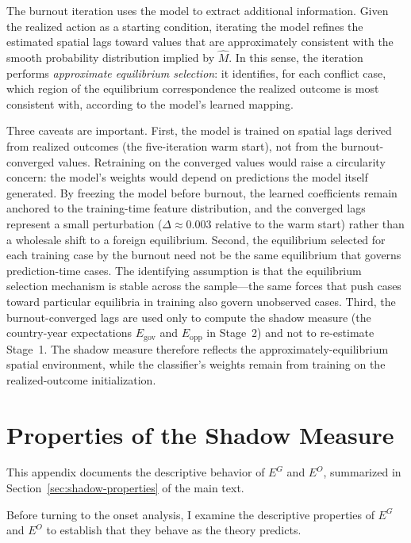 The burnout iteration uses the model to extract additional information.  Given
the realized action as a starting condition, iterating the model refines the
estimated spatial lags toward values that are approximately consistent with the
smooth probability distribution implied by $\hat{M}$.  In this sense, the
iteration performs \textit{approximate equilibrium selection}: it identifies, for each
conflict case, which region of the equilibrium correspondence the realized
outcome is most consistent with, according to the model's learned mapping.

Three caveats are important.  First, the model is trained on spatial lags
derived from realized outcomes (the five-iteration warm start), not from the
burnout-converged values.  Retraining on the converged values would raise a
circularity concern: the model's weights would depend on predictions the model
itself generated.  By freezing the model before burnout, the learned coefficients
remain anchored to the training-time feature distribution, and the converged
lags represent a small perturbation ($\Delta \approx 0.003$ relative to the warm
start) rather than a wholesale shift to a foreign equilibrium.  Second, the
equilibrium selected for each training case by the burnout need not be the same
equilibrium that governs prediction-time cases.  The identifying assumption is
that the equilibrium selection mechanism is stable across the sample---the same
forces that push cases toward particular equilibria in training also govern
unobserved cases.  Third, the burnout-converged lags are used only to compute
the shadow measure (the country-year expectations $E_\text{gov}$ and $E_\text{opp}$ in
Stage~2) and not to re-estimate Stage~1.  The shadow measure therefore reflects
the approximately-equilibrium spatial environment, while the classifier's
weights remain from training on the realized-outcome initialization.

\section{Properties of the Shadow Measure}
\label{app:properties}

This appendix documents the descriptive behavior of $E^G$ and $E^O$,
summarized in Section~\ref{sec:shadow-properties} of the main text.

Before turning to the onset analysis, I examine the descriptive properties
of $E^G$ and $E^O$ to establish that they behave as the theory predicts.

